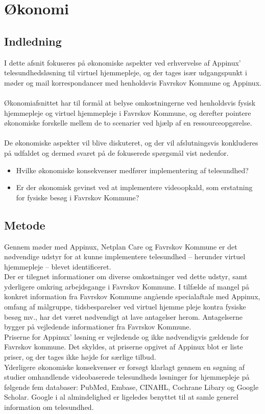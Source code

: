 \chapter{Økonomi}
\section{Indledning}
I dette afsnit fokuseres på økonomiske aspekter ved erhvervelse af Appinux’ telesundhedsløsning til virtuel hjemmepleje, og der tages især udgangspunkt i møder og mail korrespondancer med henholdsvis Favrskov Kommune og Appinux.\\ \\
Økonomiafsnittet har til formål at belyse omkostningerne ved henholdsvis fysisk hjemmepleje og virtuel hjemmepleje i Favrskov Kommune, og derefter pointere økonomiske forskelle mellem de to scenarier ved hjælp af en ressourceopgørelse.\\ \\
De økonomiske aspekter vil blive diskuteret, og der vil afslutningsvis konkluderes på udfaldet og dermed svaret på de fokuserede spørgsmål vist nedenfor.

\begin{itemize}
	\item Hvilke økonomiske konsekvenser medfører implementering af telesundhed?
	\item Er der økonomisk gevinst ved at implementere videoopkald, som erstatning for fysiske besøg i Favrskov Kommune?
\end{itemize}

\section{Metode}
Gennem møder med Appinux, Netplan Care og Favrskov Kommune er det nødvendige udstyr for at kunne implementere telesundhed – herunder virtuel hjemmepleje – blevet identificeret.\\
Der er tilegnet informationer om diverse omkostninger ved dette udstyr, samt yderligere omkring arbejdsgange i Favrskov Kommune. 
I tilfælde af mangel på konkret information fra Favrskov Kommune angående specialaftale med Appinux, omfang af målgruppe, tidsbesparelser ved virtuel hjemme pleje kontra fysiske besøg mv., har det været nødvendigt at lave antagelser herom. Antagelserne bygger på vejledende informationer fra Favrskov Kommune.\\
Priserne for Appinux’ løsning er vejledende og ikke nødvendigvis gældende for Favrskov kommune. Det skyldes, at priserne opgivet af Appinux blot er liste priser, og der tages ikke højde for særlige tilbud.\\
Yderligere økonomiske konsekvenser er forsøgt klarlagt gennem en søgning af studier omhandlende videobaserede telesundheds løsninger for hjemmepleje på følgende fem databaser: PubMed, Embase, CINAHL, Cochrane Libary og Google Scholar. Google i al almindelighed er ligeledes benyttet til at samle generel information om telesundhed. 


